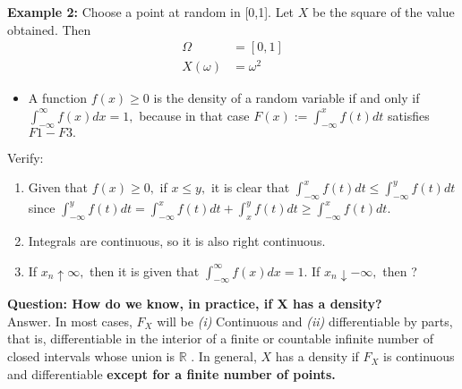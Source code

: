 \documentclass[12pt]{report} \addtolength{\textheight}{2in}
\newcommand{\totalint}{\int_{-\infty}^{\infty}}
\newcommand{\Realnum}{\mathbb{R}}
\begin{document}
\flushleft
{\textbf{Example 2:}} Choose a point at random in [0,1]. Let $X$ be the square of the value obtained. Then 
\begin{align*}
\Omega &= [0, 1]\\
X(\omega)&=\omega^2
\end{align*}
\begin{itemize}
\item 
A function $f(x) \geq 0$ is the density of a random variable if and only if $\totalint f(x)dx=1,$ because in that case $F(x):=\int_{-\infty} ^{x} f(t) dt$ satisfies $F1-F3.$
\end{itemize}
Verify: 
\begin{enumerate}[F1:]
\item Given that $f(x)\geq 0,$ if $x \leq y,$ it is clear that $\int_{-\infty} ^{x} f(t) dt \leq \int_{-\infty} ^{y} f(t) dt$ since $\int_{-\infty} ^{y} f(t) dt=\int_{-\infty} ^{x} f(t) dt+\int_{x} ^{y} f(t) dt \geq \int_{-\infty} ^{x} f(t) dt.$
\item Integrals are continuous, so it is also right continuous.
\item If $x_n \uparrow \infty, $ then it is given that $\totalint f(x)dx=1$. If $x_n \downarrow -\infty,$ then ?
\end{enumerate}
\textbf{Question: How do we know, in practice, if X has a density?}\\
Answer. In most cases, $F_X$ will be \textit{(i)} Continuous and \textit{(ii)} differentiable by parts, that is, differentiable in the interior of a finite or countable infinite number of closed intervals whose union is $\Realnum$ . In general, $X$ has a density if $F_X$ is continuous and differentiable \textbf{except for a finite number of points.}\\
\end{document}

